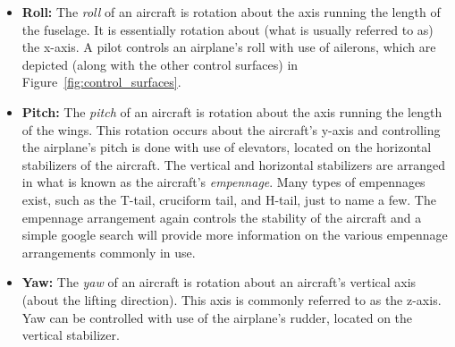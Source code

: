 \documentclass{report}
\begin{document}
\begin{itemize}
\begin{itemize}
            Before we get into the partial derivatives governing the stability characteristics of the aircraft, we first describe the primary axes about which the aircraft can pivot as well as a few other important parameters. A helpful diagram of the aircraft axes is present in Figure~\ref{fig:airframe_axes}.
            \item[] \textbf{Roll:} The \textit{roll} of an aircraft is rotation about the axis running the length of the fuselage. It is essentially rotation about (what is usually referred to as) the x-axis. A pilot controls an airplane's roll with use of ailerons, which are depicted (along with the other control surfaces) in Figure~\ref{fig:control_surfaces}.
            \item[] \textbf{Pitch:} The \textit{pitch} of an aircraft is rotation about the axis running the length of the wings. This rotation occurs about the aircraft's y-axis and controlling the airplane's pitch is done with use of elevators, located on the horizontal stabilizers of the aircraft. The vertical and horizontal stabilizers are arranged in what is known as the aircraft's \textit{empennage}. Many types of empennages exist, such as the T-tail, cruciform tail, and H-tail, just to name a few.
            The empennage arrangement again controls the stability of the aircraft and a simple google search will provide more information on the various empennage arrangements commonly in use. 
            \item[] \textbf{Yaw:} The \textit{yaw} of an aircraft is rotation about an aircraft's vertical axis (about the lifting direction). This axis is commonly referred to as the z-axis. Yaw can be controlled with use of the airplane's rudder, located on the vertical stabilizer. 
            

\end{itemize}
\end{itemize}
\end{document}
